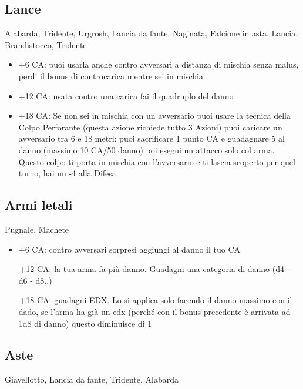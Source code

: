\documentclass[a4paper,11pt,twoside,openany]{book}
\begin{document}
\subsection{Lance} Alabarda, Tridente, Urgrosh, Lancia da fante, Naginata, Falcione in asta, Lancia, Brandistocco, Tridente

\begin{itemize}
	\item +6 CA: puoi usarla anche contro avversari a distanza di mischia senza malus, perdi il bonus di controcarica mentre sei in mischia

	\item +12 CA: usata contro una carica fai il quadruplo del danno

	\item +18 CA: Se non sei in mischia con un avversario puoi usare la tecnica della Colpo Perforante (questa azione richiede tutto 3 Azioni) puoi caricare un avversario tra 6 e 18 metri: puoi sacrificare 1 punto CA e guadagnare 5 al danno (massimo 10 CA/50 danno) poi esegui un attacco solo col arma. Questo colpo ti porta in mischia con l'avversario e ti lascia scoperto per quel turno, hai un -4 alla Difesa

\end{itemize}

\subsection{Armi letali} Pugnale, Machete

\begin{itemize}

	\item +6 CA: contro avversari sorpresi aggiungi al danno il tuo CA

	      \textbf +12 CA: la tua arma fa più danno. Guadagni una categoria di danno (d4 - d6 - d8..)

	      \textbf +18 CA: guadagni EDX. Lo si applica solo facendo il danno massimo con il dado, se l'arma ha già un edx (perché con il bonus precedente è arrivata ad 1d8 di danno)
	      questo diminuisce di 1

\end{itemize}

\subsection{Aste} Giavellotto, Lancia da fante, Tridente, Alabarda
\end{document}
